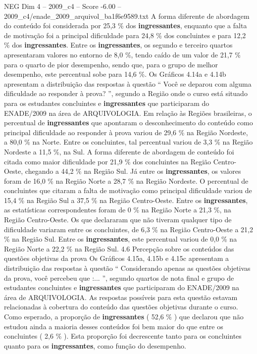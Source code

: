 \begin{textsample}{NEG Dim 4 – 2009\_c4 – Score -6.00 – 2009\_c4/enade\_2009\_arquivol\_ba1f6e9589.txt}
A forma diferente de abordagem do conteúdo foi considerada por 25,3 \% dos \textbf{ingressantes}, enquanto que a falta de motivação foi a principal dificuldade para 24,8 \% dos concluintes e para 12,2 \% dos \textbf{ingressantes}.
Entre os \textbf{ingressantes}, os segundo e terceiro quartos apresentaram valores no entorno de 8,0 \%, tendo caído de um valor de 21,7 \% para o quarto de pior desempenho, sendo que, para o grupo de melhor desempenho, este percentual sobe para 14,6 \%.
Os Gráficos 4.14a e 4.14b apresentam a distribuição das respostas à questão “ Você se deparou com alguma dificuldade ao responder à prova? ”, segundo a Região onde o curso está situado para os estudantes concluintes e \textbf{ingressantes} que participaram do ENADE/2009 na área de ARQUIVOLOGIA.
Em relação às Regiões brasileiras, o percentual de \textbf{ingressantes} que apontaram o desconhecimento do conteúdo como principal dificuldade ao responder à prova variou de 29,6 \% na Região Nordeste, a 80,0 \% na Norte.
Entre os concluintes, tal percentual variou de 3,3 \% na Região Nordeste a 11,5 \%, na Sul.
A forma diferente de abordagem de conteúdo foi citada como maior dificuldade por 21,9 \% dos concluintes na Região Centro-Oeste, chegando a 44,2 \% na Região Sul.
Já entre os \textbf{ingressantes}, os valores foram de 16,0 \% na Região Norte a 28,7 \% na Região Nordeste.
O percentual de concluintes que citaram a falta de motivação como principal dificuldade variou de 15,4 \% na Região Sul a 37,5 \% na Região Centro-Oeste.
Entre os \textbf{ingressantes}, as estatísticas correspondentes foram de 0 \% na Região Norte a 21,3 \%, na Região Centro-Oeste.
Os que declararam que não tiveram qualquer tipo de dificuldade variaram entre os concluintes, de 6,3 \% na Região Centro-Oeste a 21,2 \% na Região Sul.
Entre os \textbf{ingressantes}, este percentual variou de 0,0 \% na Região Norte a 22,2 \% na Região Sul. 4.6 Percepção sobre os conteúdos das questões objetivas da prova Os Gráficos 4.15a, 4.15b e 4.15c apresentam a distribuição das respostas à questão “ Considerando apenas as questões objetivas da prova, você percebeu que :... ”, segundo quartos de nota final e grupo de estudantes concluintes e \textbf{ingressantes} que participaram do ENADE/2009 na área de ARQUIVOLOGIA.
As respostas possíveis para esta questão estavam relacionadas à cobertura do conteúdo das questões objetivas durante o curso.
Como esperado, a proporção de \textbf{ingressantes} ( 52,6 \% ) que declarou que não estudou ainda a maioria desses conteúdos foi bem maior do que entre os concluintes ( 2,6 \% ).
Esta proporção foi decrescente tanto para os concluintes quanto para os \textbf{ingressantes}, como função do desempenho.

\end{textsample}
